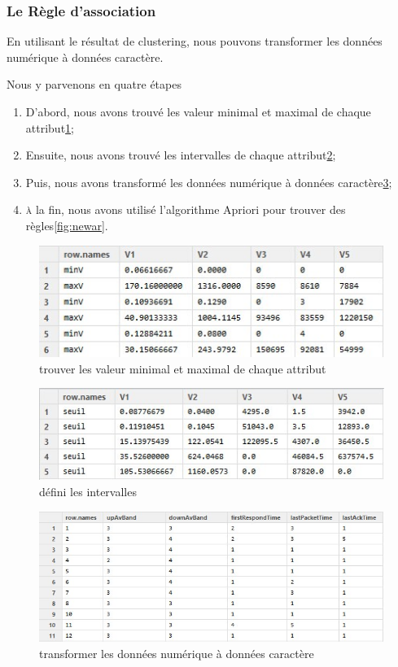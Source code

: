 \subsubsection{Le Règle d'association}
En utilisant le résultat de clustering, nous pouvons transformer les données numérique à données caractère. 

Nous y parvenons en quatre étapes
\begin{enumerate}
\item D'abord, nous avons trouvé les valeur minimal et maximal de chaque attribut\ref{fig:max-min1};
\item Ensuite, nous avons trouvé les intervalles de chaque attribut\ref{fig:seuil};
\item Puis, nous avons transformé les données numérique à données caractère\ref{fig:newData2};
\item \textsc{à} la fin, nous avons utilisé l'algorithme Apriori pour trouver des règles\ref{fig:newar}. 
\end{enumerate}
\begin{figure}[H]
\centering
\includegraphics[width=0.8\linewidth]{images/max-min1}
\caption{trouver les valeur minimal et maximal de chaque attribut}
\label{fig:max-min1}
\end{figure}


\begin{figure}[H]
\centering
\includegraphics[width=0.8\linewidth]{images/seuil}
\caption{défini les intervalles}
\label{fig:seuil}
\end{figure}

\begin{figure}[H]
\centering
\includegraphics[width=0.8\linewidth]{images/newData2}
\caption{transformer les données numérique à données caractère}
\label{fig:newData2}
\end{figure}

